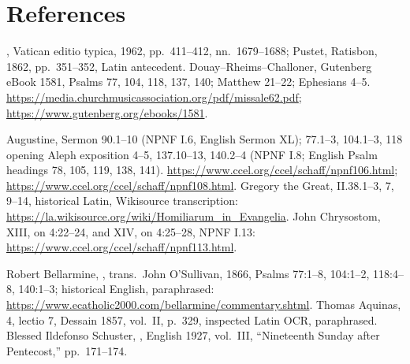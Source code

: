 \section{References}
\begin{description}[style=nextline,leftmargin=0pt,labelsep=0pt,itemsep=.35em]
\item[Appointed texts and biblical context]
, Vatican editio typica, 1962, pp.~411--412,
nn.~1679--1688; Pustet, Ratisbon, 1862, pp.~351--352, Latin antecedent.
Douay--Rheims--Challoner, Gutenberg eBook 1581, Psalms 77, 104, 118,
137, 140; Matthew 21--22; Ephesians 4--5.
\url{https://media.churchmusicassociation.org/pdf/missale62.pdf};
\url{https://www.gutenberg.org/ebooks/1581}.

\item[Patristic exegesis]
Augustine, Sermon 90.1--10 (NPNF I.6, English Sermon XL);
 77.1--3, 104.1--3, 118 opening
Aleph exposition 4--5, 137.10--13, 140.2--4 (NPNF I.8; English
Psalm headings 78, 105, 119, 138, 141).
\url{https://www.ccel.org/ccel/schaff/npnf106.html};
\url{https://www.ccel.org/ccel/schaff/npnf108.html}.
Gregory the Great,  II.38.1--3, 7,
9--14, historical Latin, Wikisource transcription:
\url{https://la.wikisource.org/wiki/Homiliarum_in_Evangelia}.
John Chrysostom,  XIII, on 4:22--24,
and XIV, on 4:25--28, NPNF I.13:
\url{https://www.ccel.org/ccel/schaff/npnf113.html}.

\item[Later exegesis and liturgical reception]
Robert Bellarmine, ,
trans. John O'Sullivan, 1866, Psalms 77:1--8, 104:1--2,
118:4--8, 140:1--3; historical English, paraphrased:
\url{https://www.ecatholic2000.com/bellarmine/commentary.shtml}.
Thomas Aquinas,  4, lectio 7, Dessain 1857,
vol.~II, p.~329, inspected Latin OCR, paraphrased.
Blessed Ildefonso Schuster, , English 1927,
vol.~III, ``Nineteenth Sunday after Pentecost,'' pp.~171--174.


\end{description}
